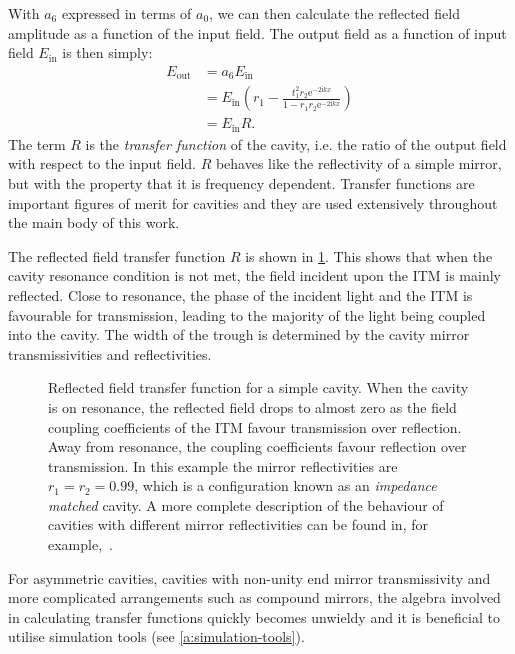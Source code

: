With $a_6$ expressed in terms of $a_0$, we can then calculate the reflected field amplitude as a function of the input field. The output field as a function of input field $E_{\text{in}}$ is then simply:
\begin{equation}
  \label{eq:fabry-perot-field}
  \begin{split}
    E_{\text{out}} &= a_6 E_{\text{in}} \\
                   &= E_{\text{in}} \left( r_1 - \frac{t_1^2 r_2 \text{e}^{-2\text{i}kx}}{1 - r_1 r_2 \text{e}^{-2\text{i}kx}} \right) \\
                   &= E_{\text{in}} R.
  \end{split}
\end{equation}
The term $R$ is the \emph{transfer function} of the cavity, i.e. the ratio of the output field with respect to the input field. $R$ behaves like the reflectivity of a simple mirror, but with the property that it is frequency dependent. Transfer functions are important figures of merit for cavities and they are used extensively throughout the main body of this work.

The reflected field transfer function $R$ is shown in \cref{fig:cavity-tf}. This shows that when the cavity resonance condition is not met, the field incident upon the \gls{ITM} is mainly reflected. Close to resonance, the phase of the incident light and the \gls{ITM} is favourable for transmission, leading to the majority of the light being coupled into the cavity. The width of the trough is determined by the cavity mirror transmissivities and reflectivities.

\begin{figure}
  \centering
  
  \caption[Reflected field transfer function for a simple \FP{} cavity]{\label{fig:cavity-tf}Reflected field transfer function for a simple \FP{} cavity. When the cavity is on resonance, the reflected field drops to almost zero as the field coupling coefficients of the ITM favour transmission over reflection. Away from resonance, the coupling coefficients favour reflection over transmission. In this example the mirror reflectivities are $r_1 = r_2 = 0.99$, which is a configuration known as an \emph{impedance matched} cavity. A more complete description of the behaviour of cavities with different mirror reflectivities can be found in, for example,~\cite{Freise2010}.}
\end{figure}

For asymmetric cavities, cavities with non-unity end mirror transmissivity and more complicated arrangements such as compound mirrors, the algebra involved in calculating transfer functions quickly becomes unwieldy and it is beneficial to utilise simulation tools (see \cref{a:simulation-tools}).


